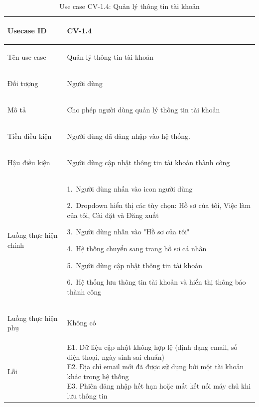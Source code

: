 \begin{table}[H]
    \centering
    \small
    \renewcommand{\arraystretch}{1.0}
    \begin{tabularx}{\textwidth}{|
        >{\bfseries\raggedright\arraybackslash}p{3.2cm}|Y|}
        \hline

        Usecase ID& CV-1.4 \\ \hline

        Tên use case & Quản lý thông tin tài khoản \\ \hline

        Đối tượng & Người dùng \\ \hline

        Mô tả & Cho phép người dùng quản lý thông tin tài khoản \\ \hline

        Tiền điều kiện &
        \parbox[t]{\hsize}{
            Người dùng đã đăng nhập vào hệ thống.\par
        } \\
        \hline

        Hậu điều kiện & Người dùng cập nhật thông tin tài khoản thành công \\ \hline

        Luồng thực hiện chính&
        \parbox[t]{\hsize}{
            1.\ Người dùng nhấn vào icon người dùng\par
            2.\ Dropdown hiển thị các tùy chọn: Hồ sơ của tôi, Việc làm của tôi, Cài đặt và Đăng xuất\par
            3.\ Người dùng nhấn vào "Hồ sơ của tôi"\par
            4.\ Hệ thống chuyển sang trang hồ sơ cá nhân\par
            5.\ Người dùng cập nhật thông tin tài khoản\par
            6.\ Hệ thống lưu thông tin tài khoản và hiển thị thông báo thành công}\\
        \hline

        Luồng thực hiện phụ& Không có \\
        \hline

        Lỗi &
        \parbox[t]{\hsize}{
            E1. Dữ liệu cập nhật không hợp lệ (định dạng email, số điện thoại, ngày sinh sai chuẩn)\\
            E2. Địa chỉ email mới đã được sử dụng bởi một tài khoản khác trong hệ thống\\
            E3. Phiên đăng nhập hết hạn hoặc mất kết nối máy chủ khi lưu thông tin
        }\\
        \hline

    \end{tabularx}

    \caption{Use case CV-1.4: Quản lý thông tin tài khoản}
    \label{tab:usecase-cv14}
\end{table}



